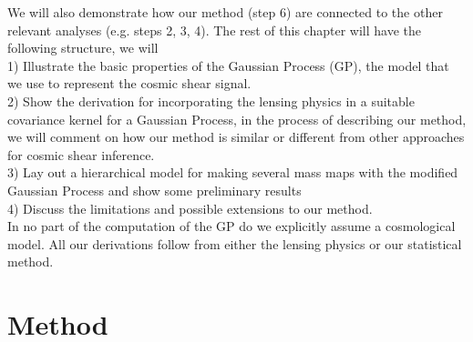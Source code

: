We will also demonstrate how our method
(step 6) are connected to the other relevant analyses (e.g. steps 2, 3, 4). 
The rest of this chapter will have the following structure, we will \\ 
1) Illustrate the basic properties of the Gaussian Process (GP), the model that we
use to represent the cosmic shear signal.\\ 
2) Show the derivation for incorporating the lensing physics in 
a suitable covariance kernel for a Gaussian Process,  
in the process of describing our method, we will comment on how our method is  
similar or different from other approaches for cosmic shear inference.\\
3) Lay out a hierarchical model for making several mass maps 
with the modified Gaussian Process and show some preliminary results \\ 
4) Discuss the limitations and possible extensions to our method.\\
In no part of the computation of the GP do we explicitly assume a cosmological model. All our
derivations follow from either the lensing physics or our statistical method.   


\section{Method}



